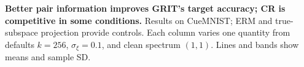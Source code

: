 \textbf{Better pair information improves GRIT's target accuracy; CR is competitive in some conditions.} Results on CueMNIST; ERM and true-subspace projection provide controls. Each column varies one quantity from defaults $k=256$, $\sigma_\xi=0.1$, and clean spectrum $(1,1)$. Lines and bands show means and sample SD.
